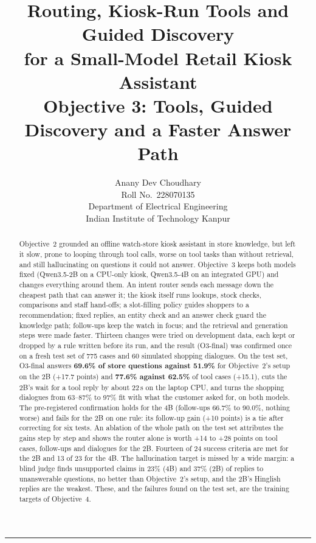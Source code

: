 \documentclass[11pt,a4paper]{article}
\title{\textbf{Routing, Kiosk-Run Tools and Guided Discovery\\for a Small-Model Retail Kiosk Assistant}\\[4pt]
\large Objective 3: Tools, Guided Discovery and a Faster Answer Path}
\author{Anany Dev Choudhary\\\small Roll No.\ 228070135\\\small Department of Electrical Engineering\\\small Indian
Institute of Technology Kanpur}
\date{\reportdate}
\begin{document}
\maketitle

\begin{abstract}
\noindent
Objective~2 grounded an offline watch-store kiosk assistant in store knowledge, but left it slow, prone to looping
through tool calls, worse on tool tasks than without retrieval, and still hallucinating on questions it could not
answer. Objective~3 keeps both models fixed (Qwen3.5-2B on a CPU-only kiosk, Qwen3.5-4B on an integrated GPU) and changes
everything around them. An intent router sends each message down the cheapest path that can answer it; the kiosk itself
runs lookups, stock checks, comparisons and staff hand-offs; a slot-filling policy guides shoppers to a recommendation;
fixed replies, an entity check and an answer check guard the knowledge path; follow-ups keep the watch in focus; and
the retrieval and generation steps were made faster. Thirteen changes were tried on development data, each kept or dropped
by a rule written before its run, and the result (O3-final) was confirmed once on a fresh test set of 775 cases and
60 simulated shopping dialogues.
On the test set, O3-final answers \textbf{69.6\% of store questions against 51.9\%} for Objective~2's setup on the 2B
(+17.7 points) and \textbf{77.6\% against 62.5\%} of tool cases (+15.1), cuts the 2B's wait for a tool reply by about
22\,s on the laptop CPU, and turns the shopping dialogues from 63--87\% to 97\% fit with what the customer asked for,
on both models. The pre-registered confirmation holds for the 4B (follow-ups 66.7\% to 90.0\%, nothing worse) and
fails for the 2B on one rule: its follow-up gain (+10 points) is a tie after correcting for six tests. An ablation of
the whole path on the test set attributes the gains step by step and shows the router alone is worth +14 to +28 points
on tool cases, follow-ups and dialogues for the 2B. Fourteen of 24 success criteria are met for the 2B and 13 of 23 for
the 4B. The hallucination target is missed by a wide margin: a blind judge finds unsupported claims in 23\% (4B) and
37\% (2B) of replies to unanswerable questions, no better than Objective~2's setup, and the 2B's Hinglish replies are the
weakest. These, and the failures found on the test set, are the training targets of Objective~4.
\end{abstract}

\tableofcontents
\vspace{6pt}
\hrule
\end{document}
